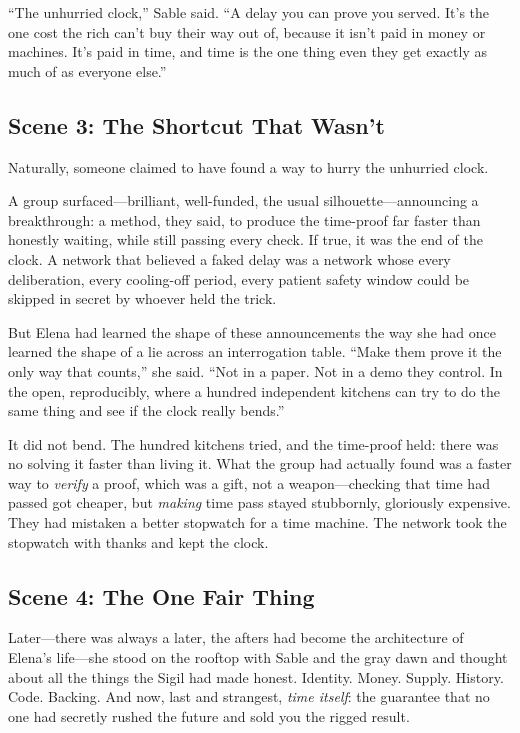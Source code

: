 \documentclass[12pt,letterpaper]{book}
\begin{document}
``The unhurried clock,'' Sable said. ``A delay you can prove you served. It's the
one cost the rich can't buy their way out of, because it isn't paid in money or
machines. It's paid in time, and time is the one thing even they get exactly as much
of as everyone else.''

\hypertarget{scene-3-the-shortcut-that-wasnt}{%
\subsection{Scene 3: The Shortcut That
Wasn't}\label{scene-3-the-shortcut-that-wasnt}}

Naturally, someone claimed to have found a way to hurry the unhurried clock.

A group surfaced---brilliant, well-funded, the usual silhouette---announcing a
breakthrough: a method, they said, to produce the time-proof far faster than
honestly waiting, while still passing every check. If true, it was the end of the
clock. A network that believed a faked delay was a network whose every
deliberation, every cooling-off period, every patient safety window could be
skipped in secret by whoever held the trick.

But Elena had learned the shape of these announcements the way she had once learned
the shape of a lie across an interrogation table. ``Make them prove it the only way
that counts,'' she said. ``Not in a paper. Not in a demo they control. In the open,
reproducibly, where a hundred independent kitchens can try to do the same thing and
see if the clock really bends.''

It did not bend. The hundred kitchens tried, and the time-proof held: there was no
solving it faster than living it. What the group had actually found was a faster way
to \emph{verify} a proof, which was a gift, not a weapon---checking that time had
passed got cheaper, but \emph{making} time pass stayed stubbornly, gloriously
expensive. They had mistaken a better stopwatch for a time machine. The network
took the stopwatch with thanks and kept the clock.

\hypertarget{scene-4-the-one-fair-thing}{%
\subsection{Scene 4: The One Fair
Thing}\label{scene-4-the-one-fair-thing}}

Later---there was always a later, the afters had become the architecture of
Elena's life---she stood on the rooftop with Sable and the gray dawn and thought
about all the things the Sigil had made honest. Identity. Money. Supply. History.
Code. Backing. And now, last and strangest, \emph{time itself}: the guarantee that
no one had secretly rushed the future and sold you the rigged result.
\end{document}
